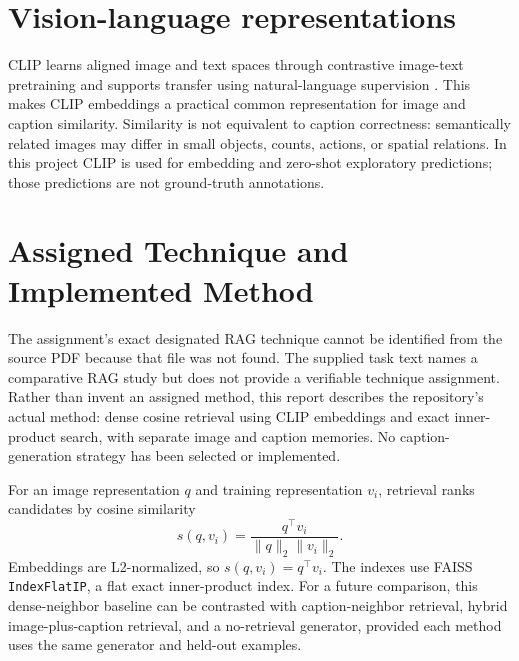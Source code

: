 \section{Vision-language representations}
CLIP learns aligned image and text spaces through contrastive image-text pretraining and supports transfer using natural-language supervision \cite{radford2021clip}. This makes CLIP embeddings a practical common representation for image and caption similarity. Similarity is not equivalent to caption correctness: semantically related images may differ in small objects, counts, actions, or spatial relations. In this project CLIP is used for embedding and zero-shot exploratory predictions; those predictions are not ground-truth annotations.

\section{Assigned Technique and Implemented Method}\label{ch:method}
The assignment's exact designated RAG technique cannot be identified from the source PDF because that file was not found. The supplied task text names a comparative RAG study but does not provide a verifiable technique assignment. Rather than invent an assigned method, this report describes the repository's actual method: dense cosine retrieval using CLIP embeddings and exact inner-product search, with separate image and caption memories. No caption-generation strategy has been selected or implemented.

For an image representation $q$ and training representation $v_i$, retrieval ranks candidates by cosine similarity
\begin{equation}\label{eq:cosine}
 s(q,v_i)=\frac{q^\top v_i}{\lVert q\rVert_2\lVert v_i\rVert_2}.
\end{equation}
Embeddings are L2-normalized, so $s(q,v_i)=q^\top v_i$. The indexes use FAISS \texttt{IndexFlatIP}, a flat exact inner-product index. For a future comparison, this dense-neighbor baseline can be contrasted with caption-neighbor retrieval, hybrid image-plus-caption retrieval, and a no-retrieval generator, provided each method uses the same generator and held-out examples.
